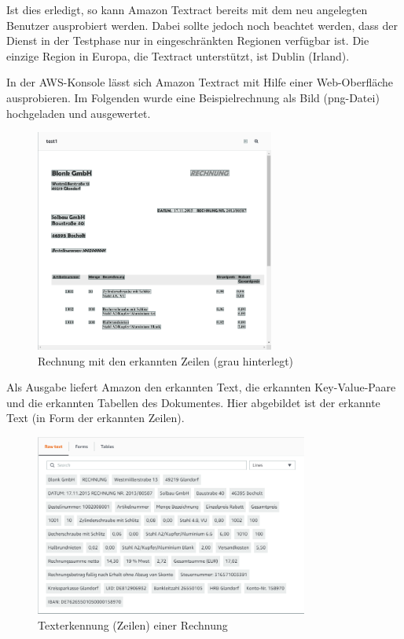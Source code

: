 \documentclass{whswinvcbook}
\begin{document}
Ist dies erledigt, so kann Amazon Textract bereits mit dem neu angelegten Benutzer ausprobiert werden. Dabei sollte jedoch noch beachtet werden, dass der Dienst in der Testphase nur in eingeschränkten Regionen verfügbar ist. Die einzige Region in Europa, die Textract unterstützt, ist Dublin (Irland).

In der AWS-Konsole lässt sich Amazon Textract mit Hilfe einer Web-Oberfläche ausprobieren. Im Folgenden wurde eine Beispielrechnung als Bild (png-Datei) hochgeladen und ausgewertet.
\begin{figure}[h]
    \centering
    \includegraphics[width=0.7\textwidth]{img/textract_aws_doc.png}
    \caption{Rechnung mit den erkannten Zeilen (grau hinterlegt)}
    \label{fig-textract-aws-doc}
\end{figure}

Als Ausgabe liefert Amazon den erkannten Text, die erkannten Key-Value-Paare und die erkannten Tabellen des Dokumentes. Hier abgebildet ist der erkannte Text (in Form der erkannten Zeilen).
\begin{figure}[h]
    \centering
    \includegraphics[width=0.8\textwidth]{img/textract_aws_ocr.png}
    \caption{Texterkennung (Zeilen) einer Rechnung}
    \label{fig-textract-aws-ocr}
\end{figure}
\end{document}
